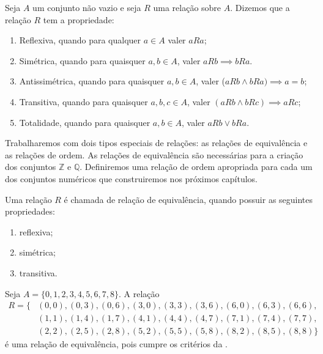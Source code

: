 \documentclass[../main.tex]{subfiles}
\begin{document}
\begin{defi}
    Seja $A$ um conjunto não vazio e seja $R$ uma relação sobre $A$. Dizemos que a relação $R$ tem a propriedade:
    \begin{enumerate}[label=(\roman*)]
        \item Reflexiva, quando para qualquer $a \in A$ valer $aRa$;
        \item Simétrica, quando para quaisquer $a,b \in A$, valer $aRb \implies bRa$.
        \item Antissimétrica, quando para quaisquer $a,b \in A$, valer ($a R b \land bRa) \implies a = b$;
        \item Transitiva, quando para quaisquer $a,b,c \in A$, valer $(aRb \land bRc) \implies aRc$;
        \item Totalidade, quando para quaisquer $a,b \in A$, valer $aRb \lor bRa$.
    \end{enumerate}
\end{defi}

Trabalharemos com dois tipos especiais de relações: as relações de equivalência e as relações de ordem. As relações de equivalência são necessárias para a criação dos conjuntos $\mathbb{Z}$ e $\mathbb{Q}$. Definiremos uma relação de ordem apropriada para cada um dos conjuntos numéricos que construiremos nos próximos capítulos.


\begin{defi}\label{agb-def-relacaoEquivalencia}
    Uma relação $R$ é chamada de relação de equivalência, quando possuir as seguintes propriedades:
    \begin{enumerate}[label=(\roman*)]
        \item reflexiva;
        \item simétrica;
        \item transitiva.
    \end{enumerate}
\end{defi}

\begin{ex}\label{agb-ex-restosDiv3}
    Seja $A = \{0,1,2,3,4,5,6,7,8\}$. A relação 
    \begin{align*}
        R = \{ & (0,0), (0,3), (0,6), (3,0), (3,3), (3,6), (6,0),(6,3), (6,6), \\
    & (1,1), (1,4), (1,7), (4,1), (4,4), (4,7), (7,1), (7,4), (7,7), \\
    & (2,2), (2,5), (2,8), (5,2), (5,5), (5,8), (8,2), (8,5), (8,8) \}
    \end{align*}
    é uma relação de equivalência, pois cumpre os critérios da .    
\end{ex}
\end{document}
